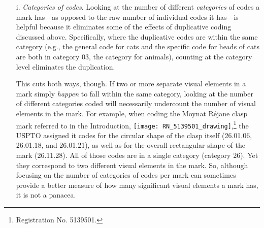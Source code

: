 \documentclass[letterpaper, 11pt, oneside]{article}
\begin{document}
\begin{enumerate}

\item[i.] \textit{Categories of codes}. Looking at the number of different \emph{categories} of codes a mark has—as opposed to the raw number of individual codes it has—is helpful because it eliminates some of the effects of duplicative coding discussed above. Specifically, where the duplicative codes are within the same category (e.g., the general code for cats and the specific code for heads of cats are both in category 03, the category for animals), counting at the category level eliminates the duplication.

This cuts both ways, though. If two or more separate visual elements in a mark simply \emph{happen} to fall within the same category, looking at the number of different categories coded will necessarily undercount the number of visual elements in the mark. For example, when coding the Moynat Réjane clasp mark referred to in the Introduction, \texttt{[image: RN\_5139501\_drawing]},\footnote{Registration No. 5139501.} the USPTO assigned it codes for the circular shape of the clasp itself (26.01.06, 26.01.18, and 26.01.21), as well as for the overall rectangular shape of the mark (26.11.28). All of those codes are in a single category (category 26). Yet they correspond to two different visual elements in the mark. So, although focusing on the number of categories of codes per mark can sometimes provide a better measure of how many significant visual elements a mark has, it is not a panacea.


\end{enumerate}
\end{document}

